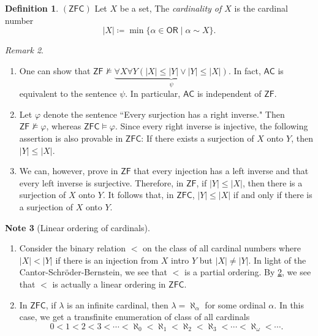 \documentclass[10pt,letterpaper,cm]{nupset}
\theoremstyle{definition}
\newtheorem{definition}{Definition}[subsection]
\newtheorem{note}[definition]{Note}
\theoremstyle{theorem}
\theoremstyle{remark}
\newtheorem{remark}[definition]{Remark}
\newcommand{\1}{\mathbf{1}}
\newcommand{\0}{\vec 0}
\newcommand{\zf}{\mathsf{ZF}}
\newcommand{\zfc}{\mathsf{ZFC}}
\newcommand{\ac}{\mathsf{AC}}
\newcommand{\ord}{\mathsf{OR}}
\begin{document}
\begin{definition}{$(\zfc)$}
Let $X$ be a set, The \textit{cardinality of $X$} is the cardinal number $$\left\lvert{X}\right\rvert \coloneqq \min\{\alpha \in \ord \mid \alpha \sim X\}.$$
\end{definition}

\begin{remark}\label{LR} $ $
\begin{enumerate}
\item One can show that $\zf \nvDash \underbrace{\forall X\forall Y(\left\lvert{X}\right\rvert \leq \left\lvert{Y}\right\rvert \vee \left\lvert{Y}\right\rvert \leq \left\lvert{X}\right\rvert)}_{\psi}$. In fact,  $\ac$ is equivalent to the sentence $\psi$. In particular, $\ac$ is independent of $\zf$.
\item Let $\varphi$ denote the sentence ``Every surjection has a right inverse."  Then $\zf \nvDash \varphi$, whereas  $\zfc \models \varphi$. Since every right inverse is injective, the following assertion is also provable in $\zfc$: If there exists a surjection of $X$ onto $Y$, then $\left\lvert{Y}\right\rvert \leq \left\lvert{X}\right\rvert$. 
\item We can, however, prove in $\zf$ that every injection has a left inverse and that every left inverse is surjective. Therefore, in $\zf$, if $\left\lvert{Y}\right\rvert \leq \left\lvert{X}\right\rvert$, then there is a surjection of $X$ onto $Y$. It follows that, in $\zfc$, $\left\lvert{Y}\right\rvert \leq \left\lvert{X}\right\rvert$ if and only if there is a surjection of $X$ onto $Y$.
\end{enumerate}
\end{remark}

\begin{note}[Linear ordering of cardinals] $ $
\begin{enumerate} 
\item Consider the binary relation $< $ on the class of all cardinal numbers where $\left\lvert{X}\right\rvert < \left\lvert{Y}\right\rvert$ if there is an injection from $X$ intro $Y$ but $\left\lvert{X}\right\rvert \ne \left\lvert{Y}\right\rvert$. In light of the Cantor-Schr\"oder-Bernstein, we see that $<$ is a partial ordering. By \cref{LR}, we see that $<$ is actually a linear ordering in $\zfc$. 
\item In $\zfc$, if $\lambda$ is an infinite cardinal, then $\lambda = \aleph_{\alpha}$ for some ordinal $\alpha$. In this case, we get a transfinite enumeration of class of all cardinals
\[
0 < 1 < 2 < 3 < \cdots < \aleph_0 < \aleph_1 < \aleph_2 < \aleph_3 <  \cdots < \aleph_{\omega} < \cdots
.\]
\end{enumerate}
\end{note}
\end{document}
